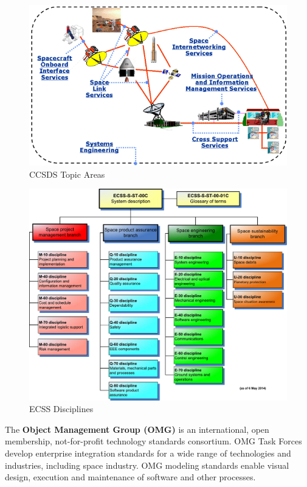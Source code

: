 \begin{figure}[h]
\centering\includegraphics[scale=0.6]{fig/ccsds_topic_areas}
\caption{CCSDS Topic Areas}
\label{fig:CCSDS Topic Areas}
\end{figure}

\begin{figure}[h]
\centering\includegraphics[scale=0.38]{fig/ecss_disciplines}
\caption{ECSS Disciplines}
\label{fig:ECSS Disciplines}
\end{figure}

The \textbf{Object Management Group (OMG)} \cite{omg.org} is an international, open membership, not-for-profit technology standards consortium. OMG Task Forces develop enterprise integration standards for a wide range of technologies and industries, including space industry. OMG modeling standards enable visual design, execution and maintenance of software and other processes. 

